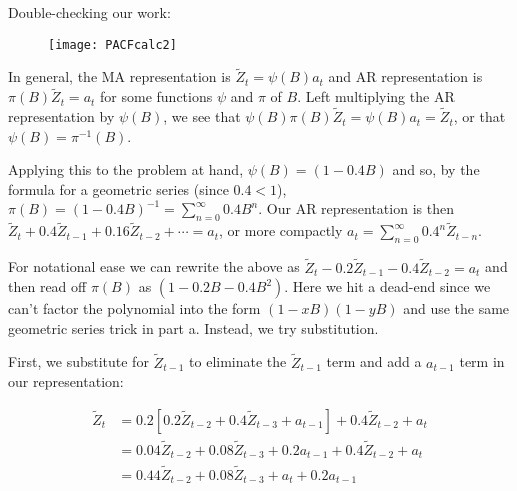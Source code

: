 \documentclass[12pt, letterpaper]{article}
\theoremstyle{definition}
\numberwithin{equation}{section}
\newcommand{\+}[1]{+_{\scalebox{.375}{#1}}}
\newcommand{\1}{\mathbbm{1}}
\begin{document}
Double-checking our work:

\begin{figure}[H]
	\centering
	\texttt{[image: PACFcalc2]}
\end{figure}









\newpage
\noindent\textbf{}

\vspace{\baselineskip}
\noindent\textbf{}
\vspace{\baselineskip}

In general, the MA representation is $\tilde{Z}_t=\psi(B)a_t$ and AR representation is $\pi(B)\tilde{Z}_t=a_t$ for some functions $\psi$ and $\pi$ of $B$. Left multiplying the AR representation by $\psi(B)$, we see that $\psi(B)\pi(B)\tilde{Z}_t=\psi(B)a_t=\tilde{Z}_t$, or that $\psi(B)=\pi^{-1}(B)$.
\vspace{\baselineskip}

Applying this to the problem at hand, $\psi(B)=(1-0.4B)$ and so, by the formula for a geometric series (since $0.4<1$), $\pi(B)=(1-0.4B)^{-1}=\sum\limits_{n=0}^{\infty}0.4B^n$. Our AR representation is then $\tilde{Z}_t+0.4\tilde{Z}_{t-1}+0.16\tilde{Z}_{t-2}+\cdots=a_t$, or more compactly $a_t=\sum\limits_{n=0}^{\infty}0.4^n\tilde{Z}_{t-n}$.

\vspace{\baselineskip}
\noindent\textbf{}
\vspace{0.05cm}

For notational ease we can rewrite the above as $\tilde{Z}_t-0.2\tilde{Z}_{t-1}-0.4\tilde{Z}_{t-2}=a_t$ and then read off $\pi(B)$ as $(1-0.2B-0.4B^2)$. Here we hit a dead-end since we can't factor the polynomial into the form $(1-xB)(1-yB)$ and use the same geometric series trick in part a. Instead, we try substitution. 
\vspace{\baselineskip}

First, we substitute for $\tilde{Z}_{t-1}$ to eliminate the $\tilde{Z}_{t-1}$ term and add a $a_{t-1}$ term in our representation:

\vspace{-0.5cm}
\begin{align*}
	\tilde{Z}_t&=0.2[0.2\tilde{Z}_{t-2}+0.4\tilde{Z}_{t-3}+a_{t-1}]+0.4\tilde{Z}_{t-2}+a_t\\
	&=0.04\tilde{Z}_{t-2}+0.08\tilde{Z}_{t-3}+0.2a_{t-1}+0.4\tilde{Z}_{t-2}+a_t\\
	&=0.44\tilde{Z}_{t-2}+0.08\tilde{Z}_{t-3}+a_t+0.2a_{t-1}
\end{align*}
\end{document}
